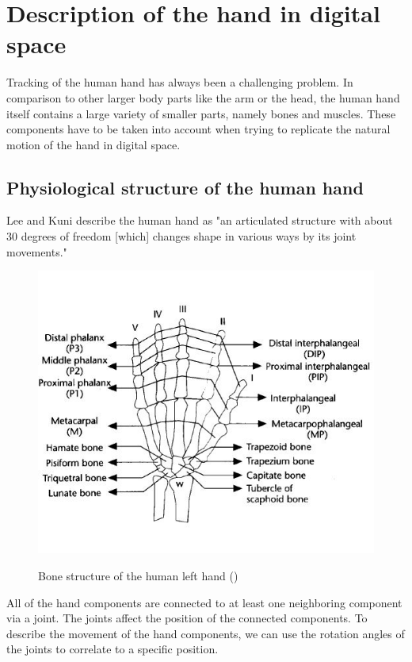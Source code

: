 
\chapter{Description of the hand in digital space}
\label{sec:Description_of_hand_in_digital_space}
Tracking of the human hand has always been a challenging problem. In comparison to other larger body parts like the arm or the head, the human hand itself contains a large variety of smaller parts, namely bones and muscles. These components have to be taken into account when trying to replicate the natural motion of the hand in digital space.
\section{Physiological structure of the human hand}
\label{sec:Physiological_structure_of_the_human_hand}
Lee and Kuni \citep{LEE.1995} describe the human hand as "an articulated structure with about 30 degrees of freedom [which] changes shape in various ways by its joint movements."
\begin{figure}[H]
	\includegraphics[scale=0.8]{images/hand.jpg}
	\label{Handstructure} 
	\caption{Bone structure of the human left hand (\cite{LEE.1995})}
\end{figure}
All of the hand components are connected to at least one neighboring component via a joint. The joints affect the position of the connected components. To describe the movement of the hand components, we can use the rotation angles of the joints to correlate to a specific position.
